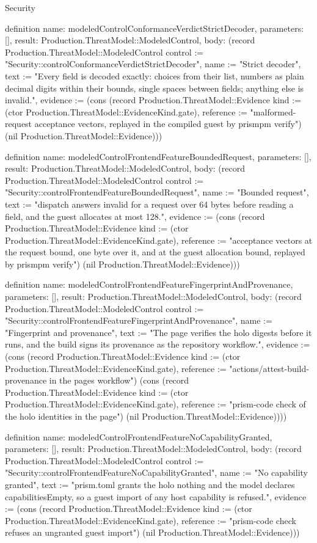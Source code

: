 \begin{lexlean}{Security}
\begin{semanticmodule}
definition{
  name: modeledControlConformanceVerdictStrictDecoder,
  parameters: [],
  result: Production.ThreatModel::ModeledControl,
  body: (record Production.ThreatModel::ModeledControl {control := "Security::controlConformanceVerdictStrictDecoder", name := "Strict decoder", text := "Every field is decoded exactly: choices from their list, numbers as plain decimal digits within their bounds, single spaces between fields; anything else is invalid.", evidence := (cons (record Production.ThreatModel::Evidence {kind := (ctor Production.ThreatModel::EvidenceKind.gate), reference := "malformed-request acceptance vectors, replayed in the compiled guest by prismpm verify"}) (nil Production.ThreatModel::Evidence))})
}

definition{
  name: modeledControlFrontendFeatureBoundedRequest,
  parameters: [],
  result: Production.ThreatModel::ModeledControl,
  body: (record Production.ThreatModel::ModeledControl {control := "Security::controlFrontendFeatureBoundedRequest", name := "Bounded request", text := "dispatch answers invalid for a request over 64 bytes before reading a field, and the guest allocates at most 128.", evidence := (cons (record Production.ThreatModel::Evidence {kind := (ctor Production.ThreatModel::EvidenceKind.gate), reference := "acceptance vectors at the request bound, one byte over it, and at the guest allocation bound, replayed by prismpm verify"}) (nil Production.ThreatModel::Evidence))})
}

definition{
  name: modeledControlFrontendFeatureFingerprintAndProvenance,
  parameters: [],
  result: Production.ThreatModel::ModeledControl,
  body: (record Production.ThreatModel::ModeledControl {control := "Security::controlFrontendFeatureFingerprintAndProvenance", name := "Fingerprint and provenance", text := "The page verifies the holo digests before it runs, and the build signs its provenance as the repository workflow.", evidence := (cons (record Production.ThreatModel::Evidence {kind := (ctor Production.ThreatModel::EvidenceKind.gate), reference := "actions/attest-build-provenance in the pages workflow"}) (cons (record Production.ThreatModel::Evidence {kind := (ctor Production.ThreatModel::EvidenceKind.gate), reference := "prism-code check of the holo identities in the page"}) (nil Production.ThreatModel::Evidence)))})
}

definition{
  name: modeledControlFrontendFeatureNoCapabilityGranted,
  parameters: [],
  result: Production.ThreatModel::ModeledControl,
  body: (record Production.ThreatModel::ModeledControl {control := "Security::controlFrontendFeatureNoCapabilityGranted", name := "No capability granted", text := "prism.toml grants the holo nothing and the model declares capabilitiesEmpty, so a guest import of any host capability is refused.", evidence := (cons (record Production.ThreatModel::Evidence {kind := (ctor Production.ThreatModel::EvidenceKind.gate), reference := "prism-code check refuses an ungranted guest import"}) (nil Production.ThreatModel::Evidence))})
}


\end{semanticmodule}
\end{lexlean}

